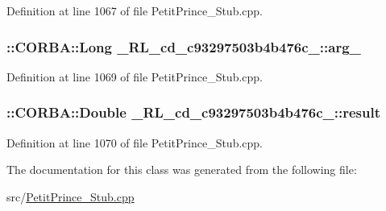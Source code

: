 Definition at line 1067 of file Petit\+Prince\+\_\+\+Stub.\+cpp.

\subsubsection[{\texorpdfstring{arg\+\_\+0}{arg_0}}]{\setlength{\rightskip}{0pt plus 5cm}\+::C\+O\+R\+B\+A\+::\+Long \+\_\+R\+L\+\_\+cd\+\_\+c93297503b4b476c\+\_\+::arg\+\_}\hypertarget{class__0_r_l__cd__c93297503b4b476c__00000000_a9d70bde12d4e7bf6319ad0d2bd20a813}{}\label{class__0_r_l__cd__c93297503b4b476c__00000000_a9d70bde12d4e7bf6319ad0d2bd20a813}


Definition at line 1069 of file Petit\+Prince\+\_\+\+Stub.\+cpp.

\subsubsection[{\texorpdfstring{result}{result}}]{\setlength{\rightskip}{0pt plus 5cm}\+::C\+O\+R\+B\+A\+::\+Double \+\_\+R\+L\+\_\+cd\+\_\+c93297503b4b476c\+\_\+::result}\hypertarget{class__0_r_l__cd__c93297503b4b476c__00000000_a1f600d809c6391de305682594e9b03f7}{}\label{class__0_r_l__cd__c93297503b4b476c__00000000_a1f600d809c6391de305682594e9b03f7}


Definition at line 1070 of file Petit\+Prince\+\_\+\+Stub.\+cpp.



The documentation for this class was generated from the following file\+:\begin{DoxyCompactItemize}
\item 
src/\hyperlink{_petit_prince___stub_8cpp}{Petit\+Prince\+\_\+\+Stub.\+cpp}\end{DoxyCompactItemize}
